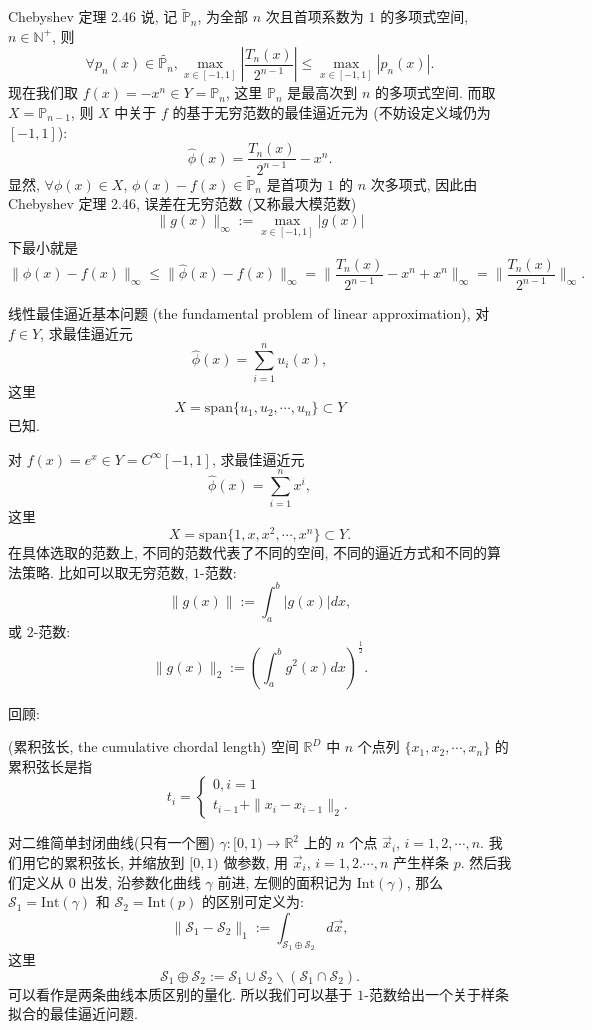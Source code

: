 \documentclass[a4paper]{ctexart}
\newcommand{\hl}[1]
{\noindent {\bf {#1}}}
\begin{document}
\hl{例 5.2}  Chebyshev 定理 2.46 说, 记 $\tilde{{\mathbb{P}}}_n$, 为全部 $n$ 次且首项系数为 $1$ 
的多项式空间, $n \in \mathbb{N}^+$, 则
$$
\forall p_n(x) \in \tilde{\mathbb{P}_n}, 
\max_{x \in [-1, 1]}\left|\frac{T_n(x)}{2^{n - 1}}\right|
\leq \max_{x \in [-1, 1]} |p_n(x)|.
$$
现在我们取 $f(x) = -x^n \in Y = \mathbb{P}_n$, 这里 $\mathbb{P}_n$ 是最高次到 $n$ 的多项式空间.
而取 $X = \mathbb{P}_{n - 1}$, 则 $X$ 中关于 $f$ 的基于无穷范数的最佳逼近元为 
(不妨设定义域仍为 $[-1, 1]$):
$$
\hat{\phi}(x) = \frac{T_n(x)}{2^{n - 1}} - x^n.
$$
显然, $\forall \phi(x) \in X$, $\phi(x) - f(x) \in \tilde{\mathbb{P}}_{n}$ 是首项为 $1$ 的
$n$ 次多项式, 因此由 Chebyshev 定理 2.46, 误差在无穷范数 (又称最大模范数)
$$
\|g(x)\|_\infty := \max_{x \in [-1, 1]}|g(x)|
$$
下最小就是
$$
\|\phi(x) - f(x)\|_\infty \leq \|\hat{\phi}(x) - f(x)\|_\infty 
= \|\frac{T_n(x)}{2^{n - 1}} - x^n + x^n\|_\infty = \|\frac{T_n(x)}{2^{n - 1}}\|_\infty.
$$

\hl{定义 5.3} 线性最佳逼近基本问题 (the fundamental problem of linear approximation), 
对 $f \in Y$, 求最佳逼近元
$$
\hat{\phi}(x) = \sum_{i = 1}^n u_i(x), 
$$
这里
$$
X = \mbox{span}\{u_1, u_2, \cdots, u_n\} \subset Y
$$
已知.

\hl{例 5.4} 对 $f(x) = e^x \in Y = C^\infty[-1, 1]$, 
求最佳逼近元
$$
\hat{\phi}(x) = \sum_{i = 1}^n x^i, 
$$
这里
$$
X = \mbox{span}\{1, x, x^2, \cdots, x^n\} \subset Y.
$$
在具体选取的范数上, 不同的范数代表了不同的空间, 不同的逼近方式和不同的算法策略.
比如可以取无穷范数, $1$-范数:
$$
\|g(x)\| := \int_a^b |g(x)| dx,
$$
或 $2$-范数:
$$
\|g(x)\|_2 := \left(\int_a^b g^2(x) dx\right)^\frac{1}{2}.
$$

回顾:

\hl{定义 3.71} (累积弦长, the cumulative chordal length) 空间 $\mathbb{R}^D$ 中 $n$
个点列 $\{x_1, x_2, \cdots, x_n\}$ 的累积弦长是指  
$$
t_i = \left\{
\begin{array}{ll}
  0, i = 1\\
  t_{i - 1} + \|x_i - x_{i - 1}\|_2.
\end{array}
\right.
$$

\hl{例 5.5} 对二维简单封闭曲线(只有一个圈) $\gamma : [0, 1) \to \mathbb{R}^2$ 
上的 $n$ 个点 $\vec{x}_i$, $i = 1, 2, \cdots, n$. 我们用它的累积弦长, 并缩放到 $[0, 1)$ 做参数,
用 $\vec{x}_i$, $i = 1, 2. \cdots, n$ 产生样条 $p$. 然后我们定义从 $0$ 出发, 沿参数化曲线 $\gamma$ 前进, 
左侧的面积记为 $\mbox{Int}(\gamma)$, 那么 $\mathcal{S}_1 = \mbox{Int}(\gamma)$ 和 
$\mathcal{S}_2 = \mbox{Int}(p)$ 的区别可定义为: 
$$
\|\mathcal{S}_1 - \mathcal{S}_2\|_1 := \int_{\mathcal{S}_1 \oplus \mathcal{S}_2} d\vec{x},
$$
这里 
$$
\mathcal{S}_1 \oplus \mathcal{S}_2 := \mathcal{S}_1 \cup \mathcal{S}_2 \backslash (\mathcal{S}_1 \cap \mathcal{S}_2).
$$
可以看作是两条曲线本质区别的量化. 所以我们可以基于 $1$-范数给出一个关于样条拟合的最佳逼近问题.
\end{document}
